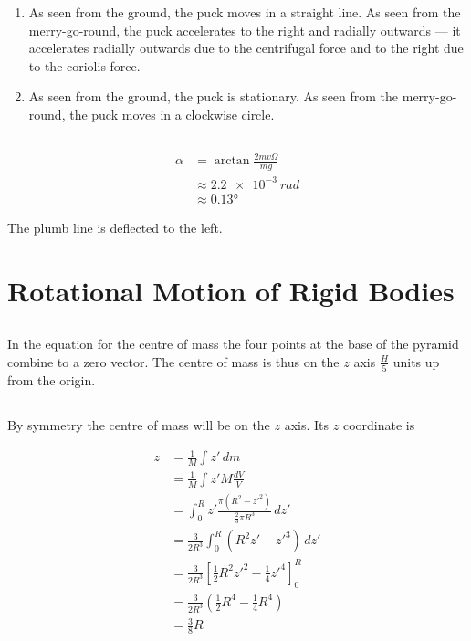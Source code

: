 \documentclass{article}
\begin{document}
\begin{enumerate}
  \item As seen from the ground, the puck moves in a straight line. As seen from the merry-go-round, the puck accelerates to the right and radially outwards — it accelerates radially outwards due to the centrifugal force and to the right due to the coriolis force.

  \item As seen from the ground, the puck is stationary. As seen from the merry-go-round, the puck moves in a clockwise circle.
\end{enumerate}

\setcounter{subsection}{24}
\subsection{}

\begin{align*}
  \alpha & = \arctan \frac{2 m v \Omega}{m g} \\
         & \approx \qty{2.2e-3}{rad}          \\
         & \approx \ang{0.13}
\end{align*}

The plumb line is deflected to the left.

\section{Rotational Motion of Rigid Bodies}

\setcounter{subsection}{2}
\subsection{}

In the equation for the centre of mass the four points at the base of the pyramid combine to a zero vector. The centre of mass is thus on the $z$ axis $\frac{H}{5}$ units up from the origin.

\setcounter{subsection}{4}
\subsection{}

By symmetry the centre of mass will be on the $z$ axis. Its $z$ coordinate is

\begin{align*}
  z & = \frac{1}{M} \int z' \,d m                                                  \\
    & = \frac{1}{M} \int z' M \frac{d V}{V}                                        \\
    & = \int_0^R z' \frac{\pi (R^2 - z'^2)}{\frac{2}{3} \pi R^3} \,d z'            \\
    & = \frac{3}{2 R^3} \int_0^R (R^2 z' - z'^3) \,d z'                            \\
    & = \frac{3}{2 R^3} \left[ \frac{1}{2} R^2 z'^2 - \frac{1}{4} z'^4 \right]_0^R \\
    & = \frac{3}{2 R^3} \left( \frac{1}{2} R^4 - \frac{1}{4} R^4 \right)           \\
    & = \frac{3}{8} R
\end{align*}
\end{document}
